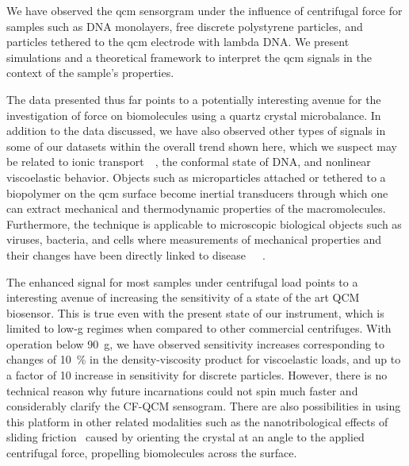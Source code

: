 \documentclass[floatfix,superscriptaddress,a4paper,twocolumn]{revtex4-1}
\begin{document}
We have observed the \gls{qcm} sensorgram under the influence of centrifugal force
for samples such as DNA monolayers, free discrete polystyrene particles,
and particles tethered to the \gls{qcm} electrode with lambda DNA.  We present
simulations and a theoretical framework to interpret the \gls{qcm} signals in the
context of the sample's properties.

The data presented thus far points to a potentially interesting avenue for
the investigation of force on biomolecules using a quartz crystal
microbalance.  In addition to the data discussed, we have also observed
other types of signals in some of our datasets within the overall trend
shown here, which we suspect may be related to ionic
transport~\cite{tolman1911electromotive}~\cite{des1893unpolarisirbare}, the
conformal state of DNA, and nonlinear viscoelastic behavior.  Objects such
as microparticles attached or tethered to a biopolymer on the \gls{qcm} surface
become inertial transducers through which one can extract mechanical and
thermodynamic properties of the macromolecules. Furthermore, the technique
is applicable to microscopic biological objects such as viruses, bacteria,
and cells where measurements of mechanical properties and their changes
have been directly linked to
disease~\cite{merkel1989molecular}~\cite{yeri2009mutation}~\cite{tevet2011friction}.

The enhanced signal for most samples under centrifugal load points to a
interesting avenue of increasing the sensitivity of a state of the art QCM
biosensor.  This is true even with the present state of our instrument,
which is limited to low-g regimes when compared to other commercial
centrifuges. With operation below \SI{90}{g}, we have observed sensitivity
increases corresponding to changes of \SI{10}{\percent} in the
density-viscosity product for viscoelastic loads, and up to a factor of 10
increase in sensitivity for discrete particles.  However, there is no
technical reason why future incarnations could not spin much faster and
considerably clarify the CF-QCM sensogram.  There are also possibilities in
using this platform in other related modalities such as the
nanotribological effects of sliding friction~\cite{krim1991nanotribology}
caused by orienting the crystal at an angle to the applied centrifugal
force, propelling biomolecules across the surface.
\end{document}
